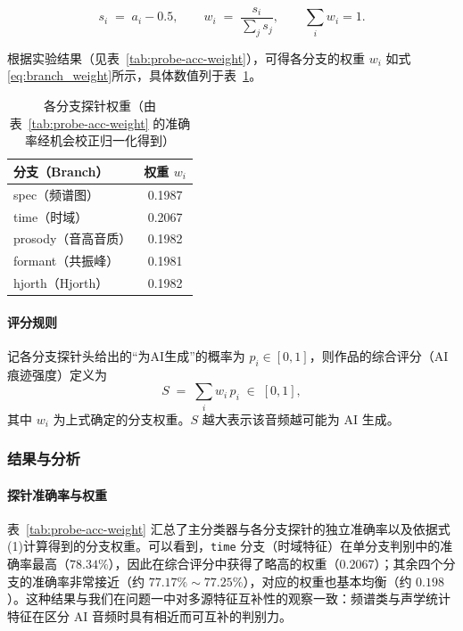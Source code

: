 \documentclass[a4paper,12pt]{article}
\begin{document}
\begin{equation}
    s_i \;=\; a_i - 0.5,\qquad 
    w_i \;=\; \frac{s_i}{\sum_j s_j},\qquad 
    \sum_i w_i = 1.
    \label{eq:branch_weight}
\end{equation}

根据实验结果（见表~\ref{tab:probe-acc-weight}），可得各分支的权重 $w_i$ 如式\ref{eq:branch_weight}所示，具体数值列于表~\ref{tab:branch-weights}。

\begin{table}[htbp]
\centering
\caption{各分支探针权重（由表~\ref{tab:probe-acc-weight} 的准确率经机会校正归一化得到）}
\label{tab:branch-weights}
\begin{tabular}{lc}
\toprule
分支（Branch） & 权重 $w_i$ \\
\midrule
spec（频谱图）      & 0.1987 \\
time（时域）        & 0.2067 \\
prosody（音高音质） & 0.1982 \\
formant（共振峰）   & 0.1981 \\
hjorth（Hjorth）    & 0.1982 \\
\bottomrule
\end{tabular}
\end{table}




\paragraph{评分规则} 记各分支探针头给出的“为AI生成”的概率为
$p_i\in[0,1]$，则作品的综合评分（AI痕迹强度）定义为
\begin{equation}
    S \;=\; \sum_{i} w_i\, p_i \;\in\;[0,1],
    \label{eq:ai_score}
\end{equation}
其中 $w_i$ 为上式确定的分支权重。$S$ 越大表示该音频越可能为 AI 生成。

\subsubsection{结果与分析}
\paragraph{探针准确率与权重} 表~\ref{tab:probe-acc-weight} 汇总了主分类器与各分支探针的独立准确率以及依据式(1)计算得到的分支权重。可以看到，\texttt{time} 分支（时域特征）在单分支判别中的准确率最高（$78.34\%$），因此在综合评分中获得了略高的权重（$0.2067$）；其余四个分支的准确率非常接近（约 $77.17\%\sim77.25\%$），对应的权重也基本均衡（约 $0.198$）。这种结果与我们在问题一中对多源特征互补性的观察一致：频谱类与声学统计特征在区分 AI 音频时具有相近而可互补的判别力。
\end{document}
